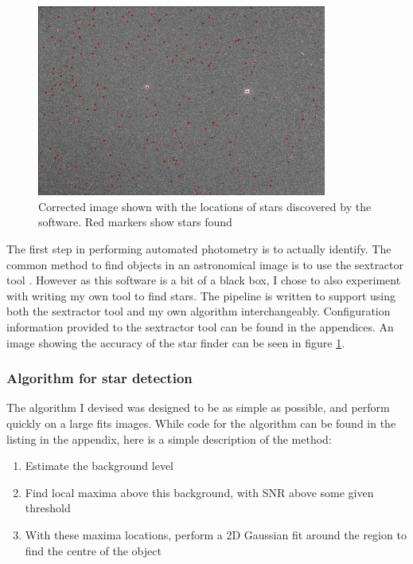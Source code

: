 \begin{figure}[ht]
    \centering
    \includegraphics[width=0.85\textwidth]{images/starfinder.png}
    \caption{Corrected image shown with the locations of stars discovered by the software. Red markers show stars found}
    \label{fig:finder_image}
\end{figure}

The first step in performing automated photometry is to actually identify. The common method to find objects in an astronomical image is to use the sextractor tool \citep{bertin1996sextractor}. However as this software is a bit of a black box, I chose to also experiment with writing my own tool to find stars. The pipeline is written to support using both the sextractor tool and my own algorithm interchangeably. Configuration information provided to the sextractor tool can be found in the appendices. An image showing the accuracy of the star finder can be seen in figure \ref{fig:finder_image}.

\subsubsection{Algorithm for star detection}

The algorithm I devised was designed to be as simple as possible, and perform quickly on a large fits images. While code for the algorithm can be found in the listing in the appendix, here is a simple description of the method:

\begin{enumerate}
    \item Estimate the background level
    \item Find local maxima above this background, with SNR above some given threshold
    \item With these maxima locations, perform a 2D Gaussian fit around the region to find the centre of the object
\end{enumerate}

